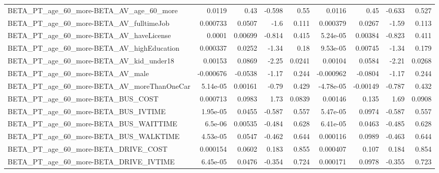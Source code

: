 \begin{tabular}{lrrrrrrrr}
BETA\_PT\_age\_60\_more-BETA\_AV\_age\_60\_more            &      0.0119 &         0.43 &   -0.598 &     0.55 &     0.0116 &        0.45 &       -0.633 &         0.527 \\
BETA\_PT\_age\_60\_more-BETA\_AV\_fulltimeJob            &    0.000733 &       0.0507 &     -1.6 &    0.111 &   0.000379 &      0.0267 &        -1.59 &         0.113 \\
BETA\_PT\_age\_60\_more-BETA\_AV\_haveLicense            &      0.0001 &      0.00699 &   -0.814 &    0.415 &   5.24e-05 &     0.00384 &       -0.823 &         0.411 \\
BETA\_PT\_age\_60\_more-BETA\_AV\_highEducation          &    0.000337 &       0.0252 &    -1.34 &     0.18 &   9.53e-05 &     0.00745 &        -1.34 &         0.179 \\
BETA\_PT\_age\_60\_more-BETA\_AV\_kid\_under18            &     0.00153 &       0.0869 &    -2.25 &   0.0241 &    0.00104 &      0.0584 &        -2.21 &        0.0268 \\
BETA\_PT\_age\_60\_more-BETA\_AV\_male                   &   -0.000676 &      -0.0538 &    -1.17 &    0.244 &  -0.000962 &     -0.0804 &        -1.17 &         0.244 \\
BETA\_PT\_age\_60\_more-BETA\_AV\_moreThanOneCar         &    5.14e-05 &      0.00161 &    -0.79 &    0.429 &  -4.78e-05 &    -0.00149 &       -0.787 &         0.432 \\
BETA\_PT\_age\_60\_more-BETA\_BUS\_COST                  &    0.000713 &       0.0983 &     1.73 &   0.0839 &    0.00146 &       0.135 &         1.69 &        0.0908 \\
BETA\_PT\_age\_60\_more-BETA\_BUS\_IVTIME                &    1.95e-05 &       0.0455 &   -0.587 &    0.557 &   5.47e-05 &      0.0974 &       -0.587 &         0.557 \\
BETA\_PT\_age\_60\_more-BETA\_BUS\_WAITTIME              &     6.5e-06 &      0.00535 &   -0.484 &    0.628 &   6.41e-05 &      0.0463 &       -0.485 &         0.628 \\
BETA\_PT\_age\_60\_more-BETA\_BUS\_WALKTIME              &    4.53e-05 &       0.0547 &   -0.462 &    0.644 &   0.000116 &      0.0989 &       -0.463 &         0.644 \\
BETA\_PT\_age\_60\_more-BETA\_DRIVE\_COST                &    0.000154 &       0.0602 &    0.183 &    0.855 &   0.000407 &       0.107 &        0.184 &         0.854 \\
BETA\_PT\_age\_60\_more-BETA\_DRIVE\_IVTIME              &    6.45e-05 &       0.0476 &   -0.354 &    0.724 &   0.000171 &      0.0978 &       -0.355 &         0.723 \\

\end{tabular}
